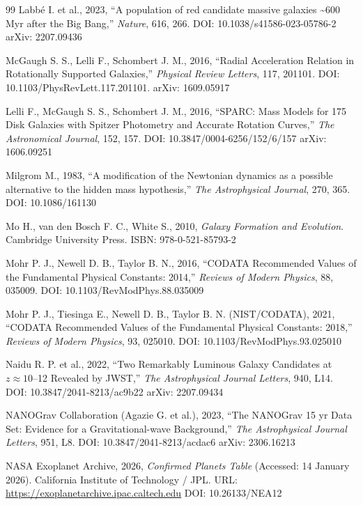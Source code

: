 \documentclass[10pt,a4paper]{article}
\begin{document}
\begin{thebibliography}{99}
Labbé I. et al., 2023, ``A population of red candidate massive galaxies \textasciitilde600 Myr after the Big Bang,'' \emph{Nature}, 616, 266. DOI: 10.1038/s41586-023-05786-2 arXiv: 2207.09436

McGaugh S. S., Lelli F., Schombert J. M., 2016, ``Radial Acceleration Relation in Rotationally Supported Galaxies,'' \emph{Physical Review Letters}, 117, 201101. DOI: 10.1103/PhysRevLett.117.201101. arXiv: 1609.05917

Lelli F., McGaugh S. S., Schombert J. M., 2016, ``SPARC: Mass Models for 175 Disk Galaxies with Spitzer Photometry and Accurate Rotation Curves,'' \emph{The Astronomical Journal}, 152, 157. DOI: 10.3847/0004-6256/152/6/157 arXiv: 1606.09251

Milgrom M., 1983, ``A modification of the Newtonian dynamics as a possible alternative to the hidden mass hypothesis,'' \emph{The Astrophysical Journal}, 270, 365. DOI: 10.1086/161130

Mo H., van den Bosch F. C., White S., 2010, \emph{Galaxy Formation and Evolution}. Cambridge University Press. ISBN: 978-0-521-85793-2

Mohr P. J., Newell D. B., Taylor B. N., 2016, ``CODATA Recommended Values of the Fundamental Physical Constants: 2014,'' \emph{Reviews of Modern Physics}, 88, 035009. DOI: 10.1103/RevModPhys.88.035009

Mohr P. J., Tiesinga E., Newell D. B., Taylor B. N. (NIST/CODATA), 2021, ``CODATA Recommended Values of the Fundamental Physical Constants: 2018,'' \emph{Reviews of Modern Physics}, 93, 025010. DOI: 10.1103/RevModPhys.93.025010

Naidu R. P. et al., 2022, ``Two Remarkably Luminous Galaxy Candidates at \(z \approx 10\)--12 Revealed by JWST,'' \emph{The Astrophysical Journal Letters}, 940, L14. DOI: 10.3847/2041-8213/ac9b22 arXiv: 2207.09434

NANOGrav Collaboration (Agazie G. et al.), 2023, ``The NANOGrav 15 yr Data Set: Evidence for a Gravitational-wave Background,'' \emph{The Astrophysical Journal Letters}, 951, L8. DOI: 10.3847/2041-8213/acdac6 arXiv: 2306.16213

NASA Exoplanet Archive, 2026, \emph{Confirmed Planets Table} (Accessed: 14 January 2026). California Institute of Technology / JPL. URL: \url{https://exoplanetarchive.ipac.caltech.edu} DOI: 10.26133/NEA12


\end{thebibliography}
\end{document}
